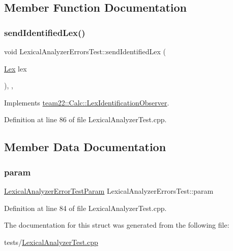 \subsection{Member Function Documentation}
\mbox{\label{struct_lexical_analyzer_errors_test_ac943a4238a0eb77957e2027740603c44}} 
\subsubsection{\texorpdfstring{send\+Identified\+Lex()}{sendIdentifiedLex()}}
{\footnotesize\ttfamily void Lexical\+Analyzer\+Errors\+Test\+::send\+Identified\+Lex (\begin{DoxyParamCaption}\item[{\hyperlink{classteam22_1_1_calc_1_1_lex}{Lex}}]{lex }\end{DoxyParamCaption})\hspace{0.3cm}{\ttfamily [inline]}, {\ttfamily [override]}, {\ttfamily [virtual]}}



Implements \hyperlink{classteam22_1_1_calc_1_1_lex_identification_observer_ac139f75c560625ec6fdb2e34cf0d4884}{team22\+::\+Calc\+::\+Lex\+Identification\+Observer}.



Definition at line 86 of file Lexical\+Analyzer\+Test.\+cpp.



\subsection{Member Data Documentation}
\mbox{\label{struct_lexical_analyzer_errors_test_a61a8ef433e2118a8723bfd8f99029126}} 
\subsubsection{\texorpdfstring{param}{param}}
{\footnotesize\ttfamily \hyperlink{struct_lexical_analyzer_error_test_param}{Lexical\+Analyzer\+Error\+Test\+Param} Lexical\+Analyzer\+Errors\+Test\+::param}



Definition at line 84 of file Lexical\+Analyzer\+Test.\+cpp.



The documentation for this struct was generated from the following file\+:\begin{DoxyCompactItemize}
\item 
tests/\hyperlink{_lexical_analyzer_test_8cpp}{Lexical\+Analyzer\+Test.\+cpp}\end{DoxyCompactItemize}
